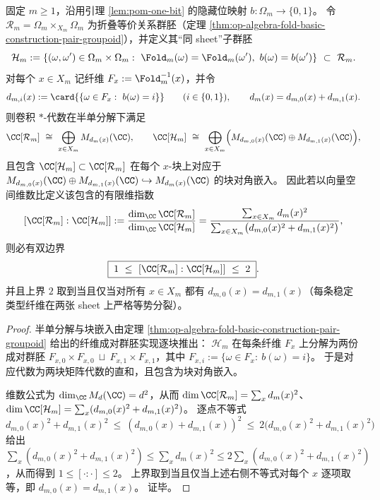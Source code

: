 \begin{proposition}[隐藏位二层细分诱导的子群胚包含与指数界]\label{prop:op-algebra-hiddenbit-sheet-subgroupoid-index}
固定 \(m\ge 1\)，沿用引理 \ref{lem:pom-one-bit} 的隐藏位映射 \(b:\Omega_m\to\{0,1\}\)。
令 \(\mathcal R_m=\Omega_m\times_{X_m}\Omega_m\) 为折叠等价关系群胚（定理 \ref{thm:op-algebra-fold-basic-construction-pair-groupoid}），并定义其“同 sheet”子群胚
\[
\mathcal H_m
:=\{(\omega,\omega')\in\Omega_m\times\Omega_m:\ \Fold_m(\omega)=\Fold_m(\omega'),\ b(\omega)=b(\omega')\}
\ \subset\ \mathcal R_m.
\]
对每个 \(x\in X_m\) 记纤维 \(F_x:=\Fold_m^{-1}(x)\)，并令
\[
d_{m,i}(x):=\card{\{\omega\in F_x:\ b(\omega)=i\}}\qquad(i\in\{0,1\}),
\qquad d_m(x)=d_{m,0}(x)+d_{m,1}(x).
\]
则卷积 \(\ast\)-代数在半单分解下满足
\[
\CC[\mathcal R_m]\ \cong\ \bigoplus_{x\in X_m} M_{d_m(x)}(\CC),
\qquad
\CC[\mathcal H_m]\ \cong\ \bigoplus_{x\in X_m}\Bigl(M_{d_{m,0}(x)}(\CC)\oplus M_{d_{m,1}(x)}(\CC)\Bigr),
\]
且包含 \(\CC[\mathcal H_m]\subset \CC[\mathcal R_m]\) 在每个 \(x\)-块上对应于
\(
M_{d_{m,0}(x)}(\CC)\oplus M_{d_{m,1}(x)}(\CC)\hookrightarrow M_{d_m(x)}(\CC)
\)
的块对角嵌入。
因此若以向量空间维数比定义该包含的有限维指数
\[
[\CC[\mathcal R_m]:\CC[\mathcal H_m]]
:=\frac{\dim_\CC \CC[\mathcal R_m]}{\dim_\CC \CC[\mathcal H_m]}
=\frac{\sum_{x\in X_m}d_m(x)^2}{\sum_{x\in X_m}\bigl(d_{m,0}(x)^2+d_{m,1}(x)^2\bigr)},
\]
则必有双边界
\[
\boxed{\;
1\ \le\ [\CC[\mathcal R_m]:\CC[\mathcal H_m]]\ \le\ 2\; }.
\]
并且上界 \(2\) 取到当且仅当对所有 \(x\in X_m\) 都有 \(d_{m,0}(x)=d_{m,1}(x)\)（每条稳定类型纤维在两张 sheet 上严格等势分裂）。
\end{proposition}
\begin{proof}
半单分解与块嵌入由定理 \ref{thm:op-algebra-fold-basic-construction-pair-groupoid} 给出的纤维成对群胚实现逐块推出：
\(\mathcal H_m\) 在每条纤维 \(F_x\) 上分解为两份成对群胚
\(
F_{x,0}\times F_{x,0}\ \sqcup\ F_{x,1}\times F_{x,1}
\)，其中 \(F_{x,i}:=\{\omega\in F_x:\ b(\omega)=i\}\)。
于是对应代数为两块矩阵代数的直和，且包含为块对角嵌入。
\par
维数公式为 \(\dim_\CC M_d(\CC)=d^2\)，从而
\(
\dim \CC[\mathcal R_m]=\sum_x d_m(x)^2
\)、
\(
\dim \CC[\mathcal H_m]=\sum_x(d_{m,0}(x)^2+d_{m,1}(x)^2)
\)。
逐点不等式
\[
d_{m,0}(x)^2+d_{m,1}(x)^2\ \le\ (d_{m,0}(x)+d_{m,1}(x))^2\ \le\ 2\bigl(d_{m,0}(x)^2+d_{m,1}(x)^2\bigr)
\]
给出
\(
\sum_x(d_{m,0}(x)^2+d_{m,1}(x)^2)\le \sum_x d_m(x)^2\le 2\sum_x(d_{m,0}(x)^2+d_{m,1}(x)^2)
\)，从而得到 \(1\le[\cdot:\cdot]\le 2\)。
上界取到当且仅当上述右侧不等式对每个 \(x\) 逐项取等，即 \(d_{m,0}(x)=d_{m,1}(x)\)。
证毕。
\end{proof}

\endinput
